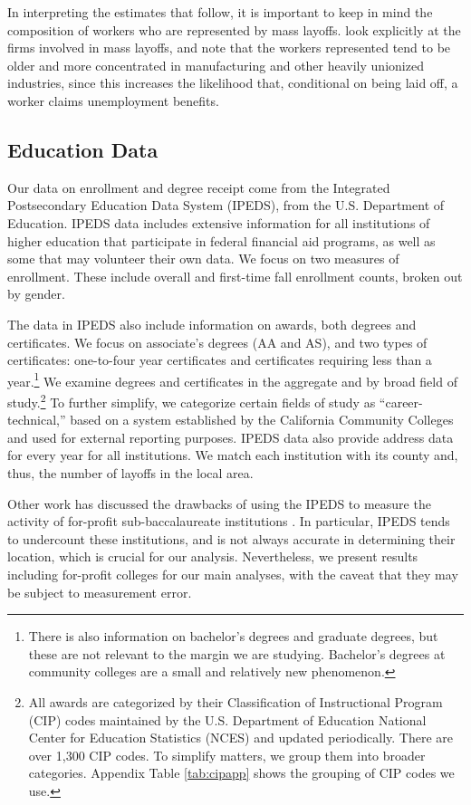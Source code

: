 In interpreting the estimates that follow, it is important to keep in mind the composition of workers who are represented by mass layoffs. \citet{Handwerker2012} look explicitly at the firms involved in mass layoffs, and note that the workers represented tend to be older and more concentrated in manufacturing and other heavily unionized industries, since this increases the likelihood that, conditional on being laid off, a worker claims unemployment benefits.

\subsection{Education Data}
Our data on enrollment and degree receipt come from the Integrated Postsecondary Education Data System (IPEDS), from the U.S. Department of Education. IPEDS data includes extensive information for all institutions of higher education that participate in federal financial aid programs, as well as some that may volunteer their own data. We focus on two measures of enrollment. These include overall and first-time fall enrollment counts, broken out by gender. 

The data in IPEDS also include information on awards, both degrees and certificates. We focus on  associate's degrees (AA and AS), and two types of certificates: one-to-four year certificates and certificates requiring less than a year.\footnote{There is also information on bachelor's degrees and graduate degrees, but these are not relevant to the margin we are studying. Bachelor's degrees at community colleges are a small and relatively new phenomenon.} We examine degrees and certificates in the aggregate and by broad field of study.\footnote{All awards are categorized by their Classification of Instructional Program (CIP) codes maintained by the U.S. Department of Education National Center for Education Statistics (NCES) and updated periodically. There are over 1,300 CIP codes. To simplify matters, we group them into broader categories. Appendix Table \ref{tab:cipapp} shows the grouping of CIP codes we use.} To further simplify, we categorize certain fields of study as ``career-technical,'' based on a system established by the California Community Colleges \citep{CCCCOtop} and used for external reporting purposes. IPEDS data also provide address data for every year for all institutions. We match each institution with its county and, thus, the number of layoffs in the local area.

Other work has discussed the drawbacks of using the IPEDS to measure the activity of for-profit sub-baccalaureate institutions \citep{Cellini2005, Cellini2010}. In particular, IPEDS tends to undercount these institutions, and is not always accurate in determining their location, which is crucial for our analysis. Nevertheless, we present results including for-profit colleges for our main analyses, with the caveat that they may be subject to  measurement error. 


